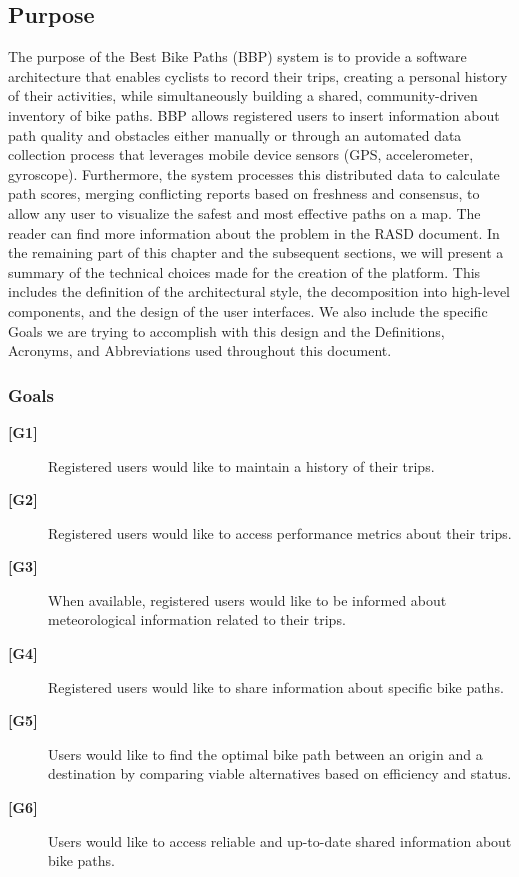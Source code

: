 \subsection{Purpose}
The purpose of the Best Bike Paths (BBP) system is to provide a software architecture that enables cyclists to record their trips, creating a personal history of their activities, while simultaneously building a shared, community-driven inventory of bike paths. BBP allows registered users to insert information about path quality and obstacles either manually or through an automated data collection process that leverages mobile device sensors (GPS, accelerometer, gyroscope). Furthermore, the system processes this distributed data to calculate path scores, merging conflicting reports based on freshness and consensus, to allow any user to visualize the safest and most effective paths on a map.
The reader can find more information about the problem in the RASD document. In the remaining part of this chapter and the subsequent sections, we will present a summary of the technical choices made for the creation of the platform. This includes the definition of the architectural style, the decomposition into high-level components, and the design of the user interfaces. We also include the specific Goals we are trying to accomplish with this design and the Definitions, Acronyms, and Abbreviations used throughout this document.

\subsubsection{Goals}
\begin{description}
    \item[\textbf{[G1]}]Registered users would like to maintain a history of their trips.
    
    \item[\textbf{[G2]}] Registered users would like to access performance metrics about their trips.
    
    \item[\textbf{[G3]}] When available, registered users would like to be informed about meteorological information related to their trips.
    
    \item[\textbf{[G4]}] Registered users would like to share information about specific bike paths.
    
    \item[\textbf{[G5]}] Users would like to find the optimal bike path between an origin and a destination by comparing viable alternatives based on efficiency and status.
    
    \item[\textbf{[G6]}] Users would like to access reliable and up-to-date shared information about bike paths.
\end{description}

